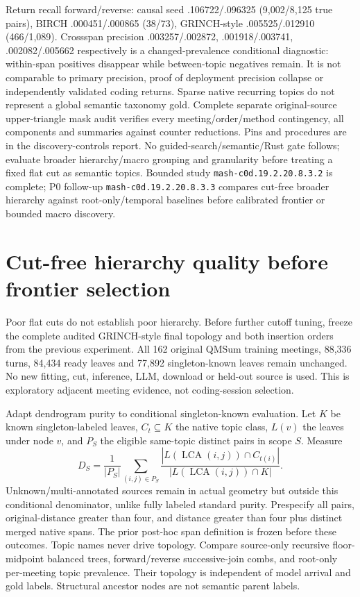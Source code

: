\documentclass[11pt]{article}
\begin{document}
Return recall forward/reverse: causal seed .106722/.096325 (9,002/8,125 true
pairs), BIRCH .000451/.000865 (38/73), GRINCH-style .005525/.012910 (466/1,089).
Crossspan precision .003257/.002872, .001918/.003741, .002082/.005662 respectively
is a changed-prevalence conditional diagnostic: within-span positives disappear
while between-topic negatives remain. It is not comparable to primary precision,
proof of deployment precision collapse or independently validated coding returns.
Sparse native recurring topics do not represent a global semantic taxonomy gold.
Complete separate original-source upper-triangle mask audit verifies every
meeting/order/method contingency, all components and summaries against counter
reductions. Pins and procedures are in the discovery-controls report. No
guided-search/semantic/Rust gate follows; evaluate broader hierarchy/macro grouping
and granularity before treating a fixed flat cut as semantic topics. Bounded
study \texttt{mash-c0d.19.2.20.8.3.2} is complete; P0 follow-up
\texttt{mash-c0d.19.2.20.8.3.3} compares cut-free broader hierarchy against
root-only/temporal baselines before calibrated frontier or bounded macro discovery.

\section{Cut-free hierarchy quality before frontier selection}
Poor flat cuts do not establish poor hierarchy. Before further cutoff tuning,
freeze the complete audited GRINCH-style final topology and both insertion orders
from the previous experiment. All 162 original QMSum training meetings, 88,336
turns, 84,434 ready leaves and 77,892 singleton-known leaves remain unchanged.
No new fitting, cut, inference, LLM, download or held-out source is used.
This is exploratory adjacent meeting evidence, not coding-session selection.

Adapt dendrogram purity\cite{grinch} to conditional singleton-known evaluation.
Let $K$ be known singleton-labeled leaves, $C_t\subseteq K$ the native topic class,
$L(v)$ the leaves under node $v$, and $P_S$ the eligible same-topic distinct pairs
in scope $S$. Measure
\[
 D_S = \frac{1}{|P_S|}\sum_{(i,j)\in P_S}
 \frac{|L(\operatorname{LCA}(i,j))\cap C_{t(i)}|}
 {|L(\operatorname{LCA}(i,j))\cap K|}.
\]
Unknown/multi-annotated sources remain in actual geometry but outside this
conditional denominator, unlike fully labeled standard purity. Prespecify all
pairs, original-distance greater than four, and distance greater than four plus
distinct merged native spans. The prior post-hoc span definition is frozen before
these outcomes. Topic names never drive topology. Compare source-only recursive
floor-midpoint balanced trees, forward/reverse successive-join combs, and root-only
per-meeting topic prevalence. Their topology is independent of model arrival and
gold labels. Structural ancestor nodes are not semantic parent labels.
\end{document}
